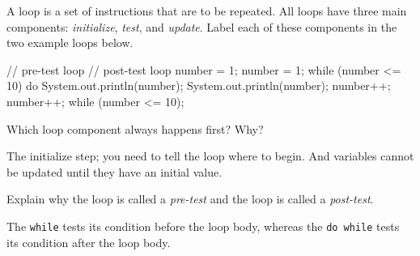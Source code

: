 
A loop is a set of instructions that are to be repeated.
All loops have three main components: \emph{initialize}, \emph{test}, and \emph{update}.
Label each of these components in the two example loops below.

\vspace{1ex}
\begin{javalst}
    // pre-test loop                         // post-test loop
    number = 1;                              number = 1;
    while (number <= 10) {                   do {
        System.out.println(number);              System.out.println(number);
        number++;                                number++;
    }                                        } while (number <= 10);
\end{javalst}

\vspace{2pt}
\hspace{3em}
\hspace{9em}




\Q Which loop component always happens first? Why?

\begin{answer}
The initialize step; you need to tell the loop where to begin.
And variables cannot be updated until they have an initial value.
\end{answer}


\Q Explain why the  loop is called a \emph{pre-test} and the  loop is called a \emph{post-test}.

\begin{answer}
The \texttt{while} tests its condition before the loop body, whereas the \texttt{do while} tests its condition after the loop body.
\end{answer}


